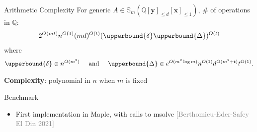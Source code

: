 \documentclass[final]{beamer}
\newlength{\colwidth}
\newcommand{\citeauthorandyear}[2]{\textcolor{gray}{[#1 #2]}}
\begin{document}
\begin{frame}[t]
\begin{columns}[t]
\begin{column}{\colwidth}
            \begin{alertblock}{Arithmetic Complexity}
                For generic $A\in\mathbb{S}_{m}(\mathbb{Q}[\bm{y}]_{\leq d}[\bm{x}]_{\leq 1})$,
                \# of operations in $\mathbb{Q}$:
                {
                \large
                \begin{equation*}
                    2^{O(mt)}n^{O(1)}(md)^{O(t)}(\upperbound{\delta}\upperbound{\Delta})^{O(t)}
                \end{equation*}
                }
                where
                \begin{align*}
                    \upperbound{\delta}  \in n^{O(m^2)}\quad  \text{ and } \quad
                    \upperbound{\Delta}  \in e^{O(m^2\log m)}n^{O(1)}d^{O(m^2+t)}t^{O(1)}.
                \end{align*}

                \textbf{Complexity}: polynomial in $n$ when $m$ is fixed
            \end{alertblock}

            \begin{block}{Benchmark}
                \begin{itemize}
                    \item First implementation in Maple, with calls to msolve
                          \citeauthorandyear{Berthomieu-Eder-Safey El Din}{2021}
                \end{itemize}


\end{block}
\end{column}
\end{columns}
\end{frame}
\end{document}

